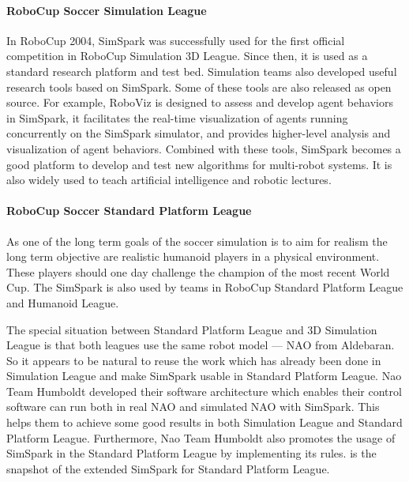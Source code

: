 \documentclass{llncs}
\begin{document}
\paragraph{RoboCup Soccer Simulation League}
In RoboCup 2004, SimSpark was successfully used for the first official competition in RoboCup Simulation 3D League. Since then, it is used as a standard research platform and test bed.
Simulation teams also developed useful research tools based on SimSpark. Some of these tools are also released as open source.
For example, RoboViz\cite{Stoecker2012} is designed to assess and develop agent behaviors in SimSpark,
it facilitates the real-time visualization of agents running concurrently on the SimSpark simulator,
and provides higher-level analysis and visualization of agent behaviors. 
Combined with these tools, SimSpark becomes a good platform to develop and test new algorithms for multi-robot systems.
It is also widely used to teach artificial intelligence and robotic lectures.

\paragraph{RoboCup Soccer Standard Platform League}
As one of the long term goals of the soccer simulation is to aim for realism the long term objective are realistic humanoid players in a physical environment.
These players should one day challenge the champion of the most recent World Cup.
The SimSpark is also used by teams in RoboCup Standard Platform League and Humanoid League.

The special situation between Standard Platform League and 3D Simulation League is that both leagues use the same robot model — NAO from Aldebaran.
So it appears to be natural to reuse the work which has already been done in Simulation League and make SimSpark usable in Standard Platform League.
Nao Team Humboldt developed their software architecture\cite{SCPR2010} which enables their control software can run both in real NAO and simulated NAO with SimSpark. This helps them to achieve some good results in both Simulation League and Standard Platform League.
Furthermore, Nao Team Humboldt also promotes the usage of SimSpark in the Standard Platform League by implementing its rules.  is the snapshot of the extended SimSpark for Standard Platform League.
\end{document}
